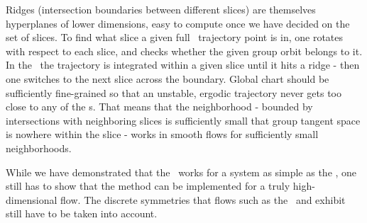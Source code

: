 Ridges (intersection boundaries between different slices) are themselves
hyperplanes of lower dimensions, easy to compute once we have decided
on the set of slices. To find what slice a given full \statesp\
trajectory point is in, one rotates with respect to each slice, and
checks whether the given group orbit belongs to it. In the \reducedsp\
the trajectory is integrated within a given slice until it hits a ridge -
then one switches to the next slice across the boundary.
Global chart should be sufficiently fine-grained so that an unstable,
ergodic trajectory never gets too close to any of the {\sset s}. That
means that the neighborhood - bounded by intersections with neighboring
slices is sufficiently small that group tangent space is nowhere within
the slice - works in smooth flows for sufficiently small neighborhoods.

While we have demonstrated that the
\mslices\ works for a system as simple as the \cLf,
one still has to show that the method can be implemented for a
truly high-dimensional flow. The discrete symmetries that flows such as the
\KS\ and {\pCf} exhibit still have to be taken into account.
